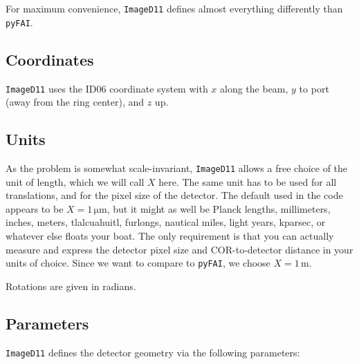 \documentclass[12pt]{article}
\begin{document}
For maximum convenience, \texttt{ImageD11} defines almost everything
differently than \texttt{pyFAI}.

\subsection{Coordinates}

\texttt{ImageD11} uses the ID06 coordinate system
with $x$ along the beam, $y$ to port (away from the ring center), and
$z$ up.

\subsection{Units}

As the problem is somewhat scale-invariant, \texttt{ImageD11}
allows a free choice of the unit of length, which we will call $X$
here. The same unit has to be used for all translations, and for the
pixel size of the detector. The default used in the code appears to be
$X = 1\,\mathrm{\mu m}$, but it might as well be Planck lengths,
millimeters, inches, meters, tlalcuahuitl, furlongs, nautical miles,
light years, kparsec, or whatever else floats your boat. The only
requirement is that you can actually measure and express the detector
pixel size and COR-to-detector distance in your units of choice. Since
we want to compare to \texttt{pyFAI}, we choose $X=1\,\mathrm{m}$.

Rotations are given in radians.

\subsection{Parameters}

\texttt{ImageD11} defines the detector geometry via the
following parameters:
\end{document}
